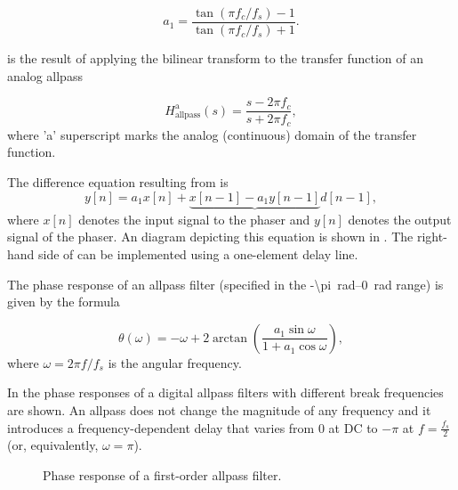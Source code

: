 \begin{equation}
    a_1 = \frac{\tan (\pi f_c / f_s) - 1}{\tan(\pi f_c / f_s) + 1}.
    \label{eq:allpass_coefficient}
\end{equation}

 is the result of applying the bilinear transform to the transfer function of an analog allpass

\begin{equation}
    H_{\text{allpass}}^{\text{a}} (s) = \frac{s - 2\pi f_c}{s + 2\pi f_c},
\end{equation}
where 'a' superscript marks the analog (continuous) domain of the transfer function.

The difference equation resulting from  is
\begin{equation}
    y[n] = a_1 x[n] + \underbrace{x[n-1] - a_1 y[n-1]}{d[n-1]},
    \label{eq:allpass_filter_difference_equation}
\end{equation}
where $x[n]$ denotes the input signal to the phaser and $y[n]$ denotes the output signal of the phaser. An diagram depicting this equation is shown in . The right-hand side of  can be implemented using a one-element delay line.


The phase response of an allpass filter (specified in the \SIrange{-\pi}{0}{rad} range) is given by the formula \cite{Kiiski2016}

\begin{equation}
    \theta (\omega) = - \omega + 2 \arctan \left( \frac{a_1 \sin \omega}{1 + a_1 \cos \omega} \right),
\end{equation}
where $\omega = 2 \pi f / f_s$ is the angular frequency.

In  the phase responses of a digital allpass filters with different break frequencies are shown. An allpass does not change the magnitude of any frequency and it introduces a frequency-dependent delay that varies from 0 at DC to $-\pi$ at $f = \frac{f_s}{2}$ (or, equivalently, $\omega = \pi$). 

\begin{figure}
    \centering
    
    \caption{Phase response of a first-order allpass filter.}
    \label{fig:phase_response_allpass_filter}
\end{figure}

